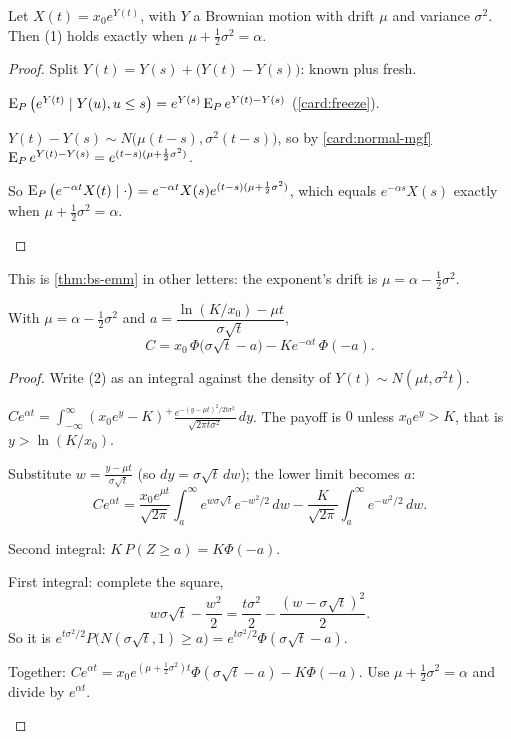 \begin{result}
\label{res:alpha-drift}
Let $X(t)=x_0e^{Y(t)}$, with $Y$ a Brownian motion with drift $\mu$ and variance $\sigma^2$. Then (1) holds exactly when $\mu+\frac12\sigma^2=\alpha$.
\end{result}
\begin{proof}
Split $Y(t)=Y(s)+\big(Y(t)-Y(s)\big)$: known plus fresh.
\begin{steps}
  \item $\operatorname{E}_P\big(e^{Y(t)}\mid Y(u),u\le s\big)=e^{Y(s)}\operatorname{E}_Pe^{Y(t)-Y(s)}$ (\cref{card:freeze}).
  \item $Y(t)-Y(s)\sim N\big(\mu(t-s),\sigma^2(t-s)\big)$, so by \cref{card:normal-mgf} $\operatorname{E}_Pe^{Y(t)-Y(s)}=e^{(t-s)(\mu+\frac12\sigma^2)}$.
  \item So $\operatorname{E}_P\big(e^{-\alpha t}X(t)\mid\cdot\big)=e^{-\alpha t}X(s)e^{(t-s)(\mu+\frac12\sigma^2)}$, which equals $e^{-\alpha s}X(s)$ exactly when $\mu+\frac12\sigma^2=\alpha$. \qedhere
\end{steps}
\end{proof}

This is \cref{thm:bs-emm} in other letters: the exponent's drift is $\mu=\alpha-\frac12\sigma^2$.

\begin{theorem}
\label{thm:bs-alpha}
With $\mu=\alpha-\frac12\sigma^2$ and $a=\dfrac{\ln(K/x_0)-\mu t}{\sigma\sqrt t}$,
\[
  C=x_0\,\Phi\big(\sigma\sqrt t-a\big)-Ke^{-\alpha t}\,\Phi(-a).
\]
\end{theorem}
\begin{proof}
Write (2) as an integral against the density of $Y(t)\sim N(\mu t,\sigma^2t)$.
\begin{steps}
  \item $Ce^{\alpha t}=\displaystyle\int_{-\infty}^\infty(x_0e^y-K)^+\frac{e^{-(y-\mu t)^2/2t\sigma^2}}{\sqrt{2\pi t\sigma^2}}\,dy$. The payoff is $0$ unless $x_0e^y>K$, that is $y>\ln(K/x_0)$.
  \item Substitute $w=\frac{y-\mu t}{\sigma\sqrt t}$ (so $dy=\sigma\sqrt t\,dw$); the lower limit becomes $a$:
  \[
    Ce^{\alpha t}=\frac{x_0e^{\mu t}}{\sqrt{2\pi}}\int_a^\infty e^{w\sigma\sqrt t}e^{-w^2/2}\,dw-\frac{K}{\sqrt{2\pi}}\int_a^\infty e^{-w^2/2}\,dw.
  \]
  \item Second integral: $K\,P(Z\ge a)=K\Phi(-a)$.
  \item First integral: complete the square,
  \[
    w\sigma\sqrt t-\frac{w^2}2=\frac{t\sigma^2}2-\frac{(w-\sigma\sqrt t)^2}2.
  \]
  So it is $e^{t\sigma^2/2}P\big(N(\sigma\sqrt t,1)\ge a\big)=e^{t\sigma^2/2}\Phi(\sigma\sqrt t-a)$.
  \item Together: $Ce^{\alpha t}=x_0e^{(\mu+\frac12\sigma^2)t}\Phi(\sigma\sqrt t-a)-K\Phi(-a)$. Use $\mu+\frac12\sigma^2=\alpha$ and divide by $e^{\alpha t}$. \qedhere
\end{steps}
\end{proof}

